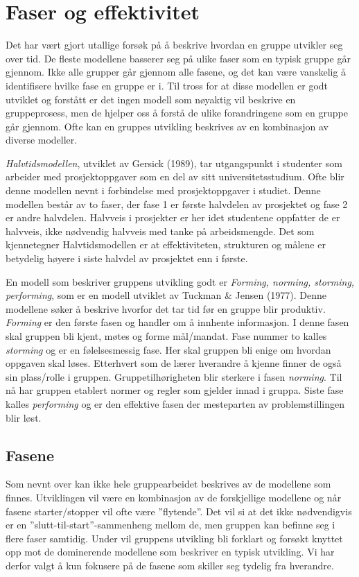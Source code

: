 \section{Faser og effektivitet}
Det har vært gjort utallige forsøk på å beskrive hvordan en gruppe utvikler seg over tid.
De fleste modellene basserer seg på ulike faser som en typisk gruppe går gjennom.
Ikke alle grupper går gjennom alle fasene, og det kan være vanskelig å identifisere hvilke fase en gruppe er i.
Til tross for at disse modellen er godt utviklet og forstått er det ingen modell som nøyaktig vil beskrive en gruppeprosess, men de hjelper oss å forstå de ulike forandringene som en gruppe går gjennom.
Ofte kan en gruppes utvikling beskrives av en kombinasjon av diverse modeller\citep{levin}.
\vspace{\secspace}

\textit{Halvtidsmodellen}, utviklet av Gersick (1989), tar utgangspunkt i studenter som arbeider med prosjektoppgaver som en del av sitt universitetsstudium.
Ofte blir denne modellen nevnt i forbindelse med prosjektoppgaver i studiet.
Denne modellen består av to faser, der fase 1 er første halvdelen av prosjektet og fase 2 er andre halvdelen.
Halvveis i prosjekter er her idet studentene oppfatter de er halvveis, ikke nødvendig halvveis med tanke på arbeidsmengde.
Det som kjennetegner Halvtidsmodellen er at effektiviteten, strukturen og målene er betydelig høyere i siste halvdel av prosjektet enn i første.\citep{levin}
\vspace{\secspace}

En modell som beskriver gruppens utvikling godt er \textit{Forming, norming, storming, performing}, som er en modell utviklet av Tuckman \& Jensen (1977).
Denne modellene søker å beskrive hvorfor det tar tid før en gruppe blir produktiv.
\textit{Forming} er den første fasen og handler om å innhente informasjon.
I denne fasen skal gruppen bli kjent, møtes og forme mål/mandat.
Fase nummer to kalles \textit{storming} og er en følelsesmessig fase.
Her skal gruppen bli enige om hvordan oppgaven skal løses.
Etterhvert som de lærer hverandre å kjenne finner de også sin plass/rolle i gruppen.
Gruppetilhørigheten blir sterkere i fasen \textit{norming}.
Til nå har gruppen etablert normer og regler som gjelder innad i gruppa.
Siste fase kalles \textit{performing} og er den effektive fasen der mesteparten av problemstillingen blir løst. \citep{levin}
\vspace{\secspace}

\subsection{Fasene}
Som nevnt over kan ikke hele gruppearbeidet beskrives av de modellene som finnes.
Utviklingen vil være en kombinasjon av de forskjellige modellene og når fasene starter/stopper vil ofte være ''flytende''.
Det vil si at det ikke nødvendigvis er en ''slutt-til-start''-sammenheng mellom de, men gruppen kan befinne seg i flere faser samtidig.
Under vil gruppens utvikling bli forklart og forsøkt knyttet opp mot de dominerende modellene som beskriver en typisk utvikling.
Vi har derfor valgt å kun fokusere på de fasene som skiller seg tydelig fra hverandre.
\vspace{\secspace}

